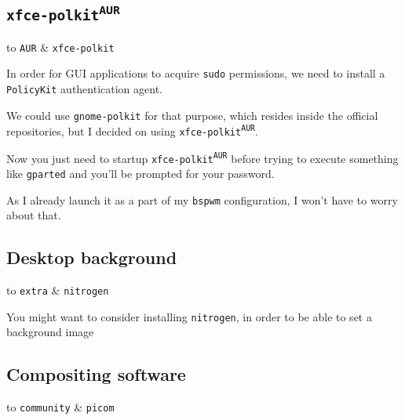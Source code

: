 \documentclass[9pt]{report}
\newenvironment{packagetable}
{\begin{longtabu}to \textwidth [b]{X[1,r]|X[1,l]}}
{\end{longtabu}}
\begin{document}
\newpage

\hypertarget{x-xfce-polkit-aur}{\subsection{\texttt{xfce-polkit}\textsuperscript{\texttt{AUR}}}}

\begin{packagetable}
    \texttt{AUR} & \texttt{xfce-polkit} \\ 
\end{packagetable}

In order for GUI applications to acquire \texttt{sudo} permissions, we need to install a \texttt{PolicyKit} authentication agent.


We could use \texttt{gnome-polkit} for that purpose, which resides inside the official repositories, but I decided on using \texttt{xfce-polkit\textsuperscript{\texttt{AUR}}}.


Now you just need to startup \texttt{xfce-polkit\textsuperscript{\texttt{AUR}}} before trying to execute something like \texttt{gparted} and you’ll be prompted for your password.


As I already launch it as a part of my \texttt{bspwm} configuration, I won’t have to worry about that.



\newpage

\hypertarget{x-desktop-background}{\subsection{Desktop background}}
\begin{packagetable}
    \texttt{extra} & \texttt{nitrogen} \\ 
\end{packagetable}

You might want to consider installing \texttt{nitrogen}, in order to be able to set a background image



\newpage

\hypertarget{x-compositing-software}{\subsection{Compositing software}}
\begin{packagetable}
    \texttt{community} & \texttt{picom} \\ 
\end{packagetable}
\end{document}
